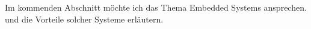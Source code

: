 Im kommenden Abschnitt möchte ich das Thema Embedded Systems ansprechen. und die Vorteile solcher Systeme erläutern. 
